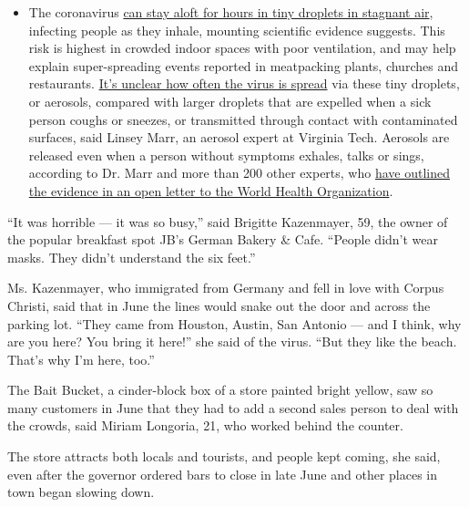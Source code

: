 \begin{itemize}
  \begin{itemize}
  \tightlist
  \item
    The coronavirus
    \href{https://www.nytimes3xbfgragh.onion/2020/07/04/health/239-experts-with-one-big-claim-the-coronavirus-is-airborne.html?action=click\&pgtype=Article\&state=default\&region=MAIN_CONTENT_3\&context=storylines_faq}{can
    stay aloft for hours in tiny droplets in stagnant air}, infecting
    people as they inhale, mounting scientific evidence suggests. This
    risk is highest in crowded indoor spaces with poor ventilation, and
    may help explain super-spreading events reported in meatpacking
    plants, churches and restaurants.
    \href{https://www.nytimes3xbfgragh.onion/2020/07/06/health/coronavirus-airborne-aerosols.html?action=click\&pgtype=Article\&state=default\&region=MAIN_CONTENT_3\&context=storylines_faq}{It's
    unclear how often the virus is spread} via these tiny droplets, or
    aerosols, compared with larger droplets that are expelled when a
    sick person coughs or sneezes, or transmitted through contact with
    contaminated surfaces, said Linsey Marr, an aerosol expert at
    Virginia Tech. Aerosols are released even when a person without
    symptoms exhales, talks or sings, according to Dr. Marr and more
    than 200 other experts, who
    \href{https://academic.oup.com/cid/article/doi/10.1093/cid/ciaa939/5867798}{have
    outlined the evidence in an open letter to the World Health
    Organization}.
  \end{itemize}
\end{itemize}

``It was horrible --- it was so busy,'' said Brigitte Kazenmayer, 59,
the owner of the popular breakfast spot JB's German Bakery \& Cafe.
``People didn't wear masks. They didn't understand the six feet.''

Ms. Kazenmayer, who immigrated from Germany and fell in love with Corpus
Christi, said that in June the lines would snake out the door and across
the parking lot. ``They came from Houston, Austin, San Antonio --- and I
think, why are you here? You bring it here!'' she said of the virus.
``But they like the beach. That's why I'm here, too.''

The Bait Bucket, a cinder-block box of a store painted bright yellow,
saw so many customers in June that they had to add a second sales person
to deal with the crowds, said Miriam Longoria, 21, who worked behind the
counter.

The store attracts both locals and tourists, and people kept coming, she
said, even after the governor ordered bars to close in late June and
other places in town began slowing down.

